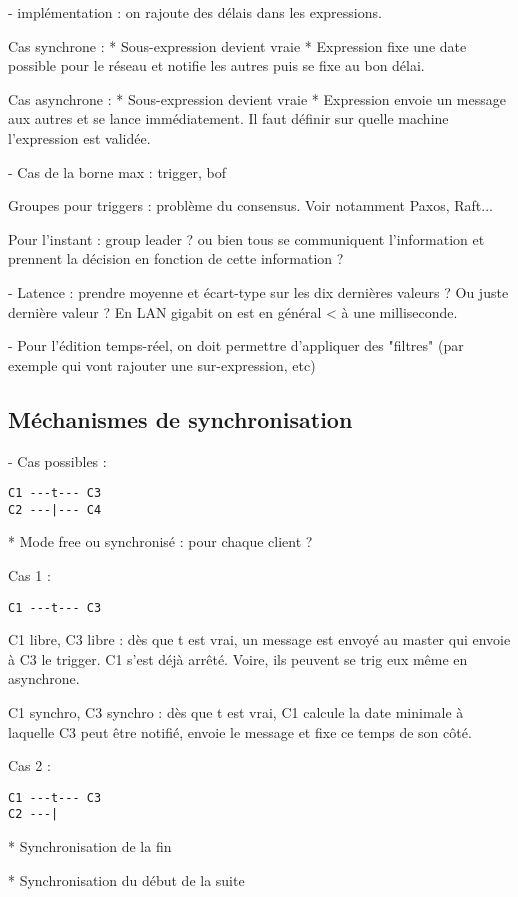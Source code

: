 \documentclass{article}
\begin{document}
- implémentation : on rajoute des délais dans les expressions.

Cas synchrone : 
* Sous-expression devient vraie
* Expression fixe une date possible pour le réseau et notifie les autres puis se fixe au bon délai.

Cas asynchrone : 
* Sous-expression devient vraie
* Expression envoie un message aux autres et se lance immédiatement.
Il faut définir sur quelle machine l'expression est validée.

- Cas de la borne max : trigger, bof

Groupes pour triggers : problème du consensus. Voir notamment Paxos, Raft... 

Pour l'instant : group leader ? ou bien tous se communiquent l'information et prennent la décision en fonction de cette information ?

- Latence : prendre moyenne et écart-type sur les dix dernières valeurs ? Ou juste dernière valeur ?
En LAN gigabit on est en général < à une milliseconde.

- Pour l'édition temps-réel, on doit permettre d'appliquer des "filtres" (par exemple qui vont rajouter une sur-expression, etc)
\subsection{Méchanismes de synchronisation}
- Cas possibles : 

\begin{lstlisting}
C1 ---t--- C3
C2 ---|--- C4
\end{lstlisting}
* Mode free ou synchronisé : pour chaque client ? 

Cas 1 : 
\begin{lstlisting}
C1 ---t--- C3
\end{lstlisting}
C1 libre, C3 libre : dès que t est vrai, un message est envoyé au master qui envoie à C3 le trigger. C1 s'est déjà arrêté.
Voire, ils peuvent se trig eux même en asynchrone.

C1 synchro, C3 synchro : dès que t est vrai, C1 calcule la date minimale à laquelle C3 peut être notifié, envoie le message et fixe ce temps de son côté.

Cas 2 : 
\begin{lstlisting}
C1 ---t--- C3
C2 ---|
\end{lstlisting}

* Synchronisation de la fin

* Synchronisation du début de la suite
\end{document}
